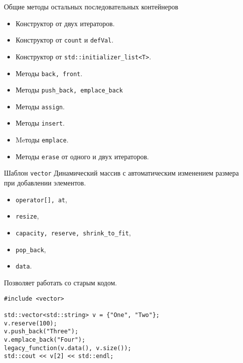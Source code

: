 \documentclass{beamer}
\begin{document}
\begin{frame}{Общие методы остальных последовательных контейнеров}
\begin{itemize}
    \item Конструктор от двух итераторов.  
    \item Конструктор от \texttt{count} и \texttt{defVal}.
    \item Конструктор от \texttt{std::initializer\_list<T>}.
    \item Методы {\tt back, front}.
    \item Методы \texttt{push\_back, emplace\_back}    
    \item Методы {\tt assign}.
    \item Методы {\tt insert}. 
    \item Meтоды \texttt{emplace}.
    \item Методы \texttt{erase} от одного и двух итераторов. 
\end{itemize}
\end{frame}

\begin{frame}[fragile]{Шаблон {\tt vector}}
    Динамический массив с автоматическим изменением размера\\ при
    добавлении элементов.

\begin{itemize}
    \item \texttt{operator[], at},
    \item \texttt{resize},
    \item \texttt{capacity, reserve, shrink\_to\_fit},
    \item \texttt{pop\_back},
    \item \texttt{data}.
\end{itemize}

Позволяет работать со старым кодом.
\begin{lstlisting}
#include <vector>

std::vector<std::string> v = {"One", "Two"};
v.reserve(100);
v.push_back("Three");
v.emplace_back("Four");
legacy_function(v.data(), v.size());
std::cout << v[2] << std::endl;
\end{lstlisting}
\end{frame}
           
\end{document}
